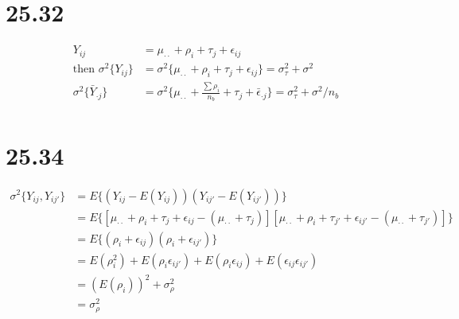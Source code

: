 \documentclass{article}\usepackage[]{graphicx}\usepackage[]{color}
\begin{document}
\section {25.32}

\begin{displaymath}
\begin{split}
Y_{ij} &= \mu_{\cdot\cdot} + \rho_i + \tau_j + \epsilon_{ij}\\
\text{then } \sigma^2\{Y_{ij} \} &= \sigma^2\{\mu_{\cdot\cdot} + \rho_i + \tau_j + \epsilon_{ij} \} = \sigma_\tau^2+\sigma^2\\
\sigma^2\{\bar{Y}_{\cdot j} \} &= \sigma^2\{\mu_{\cdot\cdot} + \frac{\sum\rho_i}{n_b} + \tau_j + \bar{\epsilon}_{\cdot j} \} = \sigma_\tau^2+\sigma^2/n_b\\
\end{split}
\end{displaymath}

\section{25.34}
\begin{displaymath}
\begin{split}
\sigma^2\{  Y_{ij},Y_{ij'}\} &= E\{ (Y_{ij}-E(Y_{ij}))(Y_{ij'}-E(Y_{ij'}))\} \\
                           &= E\{ [\mu_{\cdot\cdot} + \rho_i + \tau_j + \epsilon_{ij} -(\mu_{\cdot\cdot} + \tau_j)][\mu_{\cdot\cdot} + \rho_i + \tau_{j'} + \epsilon_{ij'} -(\mu_{\cdot\cdot} + \tau_{j'})]\}\\
                           &= E\{ (\rho_i +\epsilon_{ij})(\rho_i +\epsilon_{ij'}) \}\\
                           &= E(\rho_i^2) + E(\rho_i\epsilon_{ij'})+E(\rho_i\epsilon_{ij})+E(\epsilon_{ij}\epsilon_{ij'})\\
                           &= (E(\rho_i))^2+\sigma_\rho^2\\
                           &=\sigma_\rho^2
\end{split}
\end{displaymath}
\end{document}
